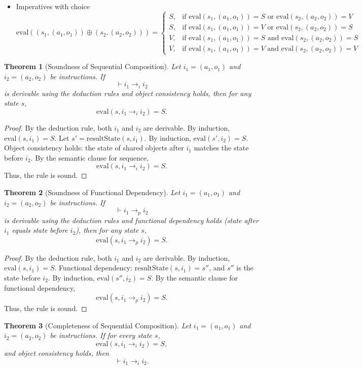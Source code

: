 \documentclass[a4paper,11pt]{lmcs}
\newtheorem{theorem}{Theorem}
\begin{document}
\begin{itemize}
\item Imperatives with choice
\[
\text{eval}((s_1, (a_1, o_1)) \oplus (s_2, (a_2, o_2))) =
\begin{cases}
S, & \text{if } \text{eval}(s_1, (a_1, o_1)) = S
  \text{ or } \text{eval}(s_2, (a_2, o_2)) = V  \\[1.5ex]
S, & \text{if } \text{eval}(s_1, (a_1, o_1)) = V
  \text{ or } \text{eval}(s_2, (a_2, o_2)) = S  \\[1.5ex]
V, & \text{if } \text{eval}(s_1, (a_1, o_1)) = S
  \text{ and } \text{eval}(s_2, (a_2, o_2)) = S \\[1.5ex]
V, & \text{if } \text{eval}(s_1, (a_1, o_1)) = V
  \text{ and } \text{eval}(s_2, (a_2, o_2)) = V
\end{cases}
\]


\end{itemize}

\begin{theorem}[Soundness of Sequential Composition]
Let $i_1 = (a_1, o_1)$ and $i_2 = (a_2, o_2)$ be instructions. If
\[
\vdash i_1 \rightarrow_i i_2
\]
is derivable using the deduction rules and object consistency holds, then for any state $s$,
\[
\text{eval}(s, i_1 \rightarrow_i i_2) = S.
\]
\end{theorem}

\begin{proof}
By the deduction rule, both $i_1$ and $i_2$ are derivable.
By induction, $\text{eval}(s, i_1) = S$.
Let $s' = \text{resultState}(s, i_1)$. By induction, $\text{eval}(s', i_2) = S$.
Object consistency holds: the state of shared objects after $i_1$ matches the state before $i_2$.
By the semantic clause for sequence,
\[
\text{eval}(s, i_1 \rightarrow_i i_2) = S.
\]
Thus, the rule is sound.
\end{proof}
\begin{theorem}[Soundness of Functional Dependency]
Let $i_1 = (a_1, o_1)$ and $i_2 = (a_2, o_2)$ be instructions. If
\[
\vdash i_1 \rightarrow_p i_2
\]
is derivable using the deduction rules and functional dependency holds (state after $i_1$ equals state before $i_2$), then for any state $s$,
\[
\text{eval}(s, i_1 \rightarrow_p i_2) = S.
\]
\end{theorem}

\begin{proof}
By the deduction rule, both $i_1$ and $i_2$ are derivable.
By induction, $\text{eval}(s, i_1) = S$.
Functional dependency: $\text{resultState}(s, i_1) = s''$, and $s''$ is the state before $i_2$.
By induction, $\text{eval}(s'', i_2) = S$.
By the semantic clause for functional dependency,
\[
\text{eval}(s, i_1 \rightarrow_p i_2) = S.
\]
Thus, the rule is sound.
\end{proof}
\begin{theorem}[Completeness of Sequential Composition]
Let $i_1 = (a_1, o_1)$ and $i_2 = (a_2, o_2)$ be instructions. If for every state $s$,
\[
\text{eval}(s, i_1 \rightarrow_i i_2) = S,
\]
and object consistency holds, then
\[
\vdash i_1 \rightarrow_i i_2.
\]
\end{theorem}
\end{document}
